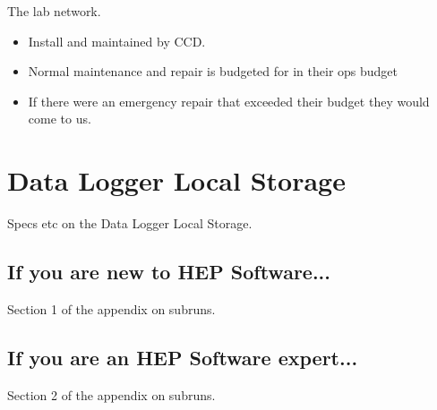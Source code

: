 The lab network.
\begin{itemize}
\item Install and maintained by CCD.
\item Normal maintenance and repair is budgeted for in their ops budget
\item If there were an emergency repair that exceeded their budget they would come to us. 
\end{itemize}

\chapter{Data Logger Local Storage}
\label{app:DataLoggerLocalStorage}

Specs etc on the Data Logger Local Storage.


\section{If you are new to HEP Software...}

Section 1 of the appendix on subruns.


\section{If you are an HEP Software expert...}

Section 2 of the appendix on subruns.


\clearpage
{}
{}
\printbibliography



